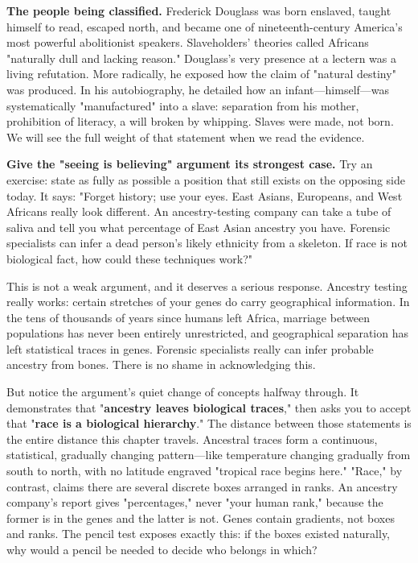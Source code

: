 \textbf{The people being classified.} Frederick Douglass was born enslaved, taught himself to read, escaped north, and became one of nineteenth-century America's most powerful abolitionist speakers. Slaveholders' theories called Africans "naturally dull and lacking reason." Douglass's very presence at a lectern was a living refutation. More radically, he exposed how the claim of "natural destiny" was produced. In his autobiography, he detailed how an infant---himself---was systematically "manufactured" into a slave: separation from his mother, prohibition of literacy, a will broken by whipping. Slaves were made, not born. We will see the full weight of that statement when we read the evidence.

\textbf{Give the "seeing is believing" argument its strongest case.} Try an exercise: state as fully as possible a position that still exists on the opposing side today. It says: "Forget history; use your eyes. East Asians, Europeans, and West Africans really look different. An ancestry-testing company can take a tube of saliva and tell you what percentage of East Asian ancestry you have. Forensic specialists can infer a dead person's likely ethnicity from a skeleton. If race is not biological fact, how could these techniques work?"

This is not a weak argument, and it deserves a serious response. Ancestry testing really works: certain stretches of your genes do carry geographical information. In the tens of thousands of years since humans left Africa, marriage between populations has never been entirely unrestricted, and geographical separation has left statistical traces in genes. Forensic specialists really can infer probable ancestry from bones. There is no shame in acknowledging this.

But notice the argument's quiet change of concepts halfway through. It demonstrates that "\textbf{ancestry leaves biological traces}," then asks you to accept that "\textbf{race is a biological hierarchy}." The distance between those statements is the entire distance this chapter travels. Ancestral traces form a continuous, statistical, gradually changing pattern---like temperature changing gradually from south to north, with no latitude engraved "tropical race begins here." "Race," by contrast, claims there are several discrete boxes arranged in ranks. An ancestry company's report gives "percentages," never "your human rank," because the former is in the genes and the latter is not. Genes contain gradients, not boxes and ranks. The pencil test exposes exactly this: if the boxes existed naturally, why would a pencil be needed to decide who belongs in which?

